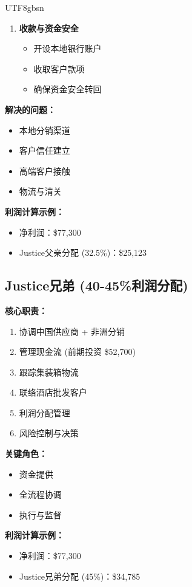 \documentclass[12pt,a4paper]{article}
\begin{document}
\begin{CJK}{UTF8}{gbsn}
\begin{enumerate}
    \item \textbf{收款与资金安全}
    \begin{itemize}
        \item 开设本地银行账户
        \item 收取客户款项
        \item 确保资金安全转回
    \end{itemize}
\end{enumerate}

\textbf{解决的问题：}
\begin{itemize}
    \item 本地分销渠道
    \item 客户信任建立
    \item 高端客户接触
    \item 物流与清关
\end{itemize}

\textbf{利润计算示例：}
\begin{itemize}
    \item 净利润：\$77,300
    \item Justice父亲分配 (32.5\%)：\$25,123
\end{itemize}

\subsection{Justice兄弟 (40-45\%利润分配)}

\textbf{核心职责：}
\begin{enumerate}
    \item 协调中国供应商 + 非洲分销
    \item 管理现金流 (前期投资 \$52,700)
    \item 跟踪集装箱物流
    \item 联络酒店批发客户
    \item 利润分配管理
    \item 风险控制与决策
\end{enumerate}

\textbf{关键角色：}
\begin{itemize}
    \item 资金提供
    \item 全流程协调
    \item 执行与监督
\end{itemize}

\textbf{利润计算示例：}
\begin{itemize}
    \item 净利润：\$77,300
    \item Justice兄弟分配 (45\%)：\$34,785
\end{itemize}

\end{CJK}
\end{document}
